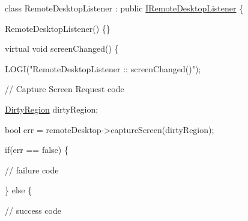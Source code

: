 \begin{DoxyPre} class RemoteDesktopListener : public \hyperlink{classknoxremotedesktop_1_1IRemoteDesktopListener}{IRemoteDesktopListener} \{\end{DoxyPre}



\begin{DoxyPre} 	 RemoteDesktopListener() \{\}\end{DoxyPre}



\begin{DoxyPre} 	 virtual void screenChanged() \{\end{DoxyPre}



\begin{DoxyPre} 		 LOGI("RemoteDesktopListener :: screenChanged()");\end{DoxyPre}



\begin{DoxyPre}		   	 // Capture Screen Request code\end{DoxyPre}



\begin{DoxyPre}			 \hyperlink{classknoxremotedesktop_1_1DirtyRegion}{DirtyRegion} dirtyRegion;\end{DoxyPre}



\begin{DoxyPre}			 bool err = remoteDesktop->captureScreen(dirtyRegion);\end{DoxyPre}



\begin{DoxyPre}			 if(err == false)  \{\end{DoxyPre}



\begin{DoxyPre}				 // failure code\end{DoxyPre}



\begin{DoxyPre}			\} else \{\end{DoxyPre}



\begin{DoxyPre}				 // success code\end{DoxyPre}



